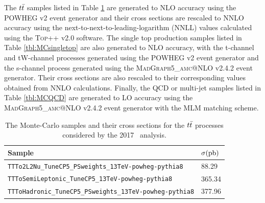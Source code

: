 The $\qrkt\bar{\qrkt}$\cite{MCTT} samples listed in Table \ref{tbl:MCttbar} are generated to NLO accuracy using the \textsc{\small POWHEG} v2 event generator and their cross sections are rescaled to NNLO accuracy using the next-to-next-to-leading-logarithm (NNLL) values calculated using the \textsc{\small Top++} v2.0\cite{TOPPP} software. The single top production samples listed in Table \ref{tbl:MCsingletop} are also generated to NLO accuracy, with the t-channel\cite{MCsingletopT} and tW-channel\cite{MCsingletopTW} processes generated using the \textsc{\small POWHEG} v2 event generator and the s-channel\cite{MCsingletopS} process generated using the \textsc{\small MadGraph5\_amc@NLO} v2.4.2 event generator. Their cross sections are also rescaled to their corresponding values obtained from NNLO calculations.\cite{singletopNNLOA,singletopNNLOB} Finally, the QCD or multi-jet samples listed in Table \ref{tbl:MCQCD} are generated to LO accuracy using the \textsc{\small MadGraph5\_amc@NLO} v2.4.2 event generator with the MLM matching scheme. 

\begin{table}[htbp]
  \caption[$\qrkt\bar{\qrkt}$ Samples for \VHbb\ 2017]{The Monte-Carlo samples and their cross sections for the $\qrkt\bar{\qrkt}$ processes considered by the 2017 \VHbb\ analysis.}
  \label{tbl:MCttbar}
  \begin{tabularx}{6.5in}{lX}
    \hline
    Sample                                                          & $\sigma (\mathrm{pb})$ \\
    \hline
    \texttt{TTTo2L2Nu\_TuneCP5\_PSweights\_13TeV-powheg-pythia8}    & 88.29          \\
    \texttt{TTToSemiLeptonic\_TuneCP5\_13TeV-powheg-pythia8}        & 365.34         \\
    \texttt{TTToHadronic\_TuneCP5\_PSweights\_13TeV-powheg-pythia8} & 377.96         \\
    \hline
  \end{tabularx}
\end{table}

